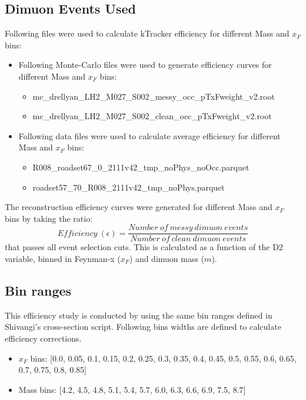 \documentclass[11pt]{article}
\begin{document}
\subsection{Dimuon Events Used}
Following files were used to calculate kTracker efficiency for different Mass and $x_{F}$ bins:
\begin{itemize}
 \item Following Monte-Carlo files were used to generate efficiency curves for different Mass and $x_{F}$ bins:
 \begin{itemize}
  \item mc\_drellyan\_LH2\_M027\_S002\_messy\_occ\_pTxFweight\_v2.root
  \item mc\_drellyan\_LH2\_M027\_S002\_clean\_occ\_pTxFweight\_v2.root
 \end{itemize}
 \item Following data files were used to calculate average efficiency for different Mass and $x_{F}$ bins:
 \begin{itemize}
	 \item R008\_roadset67\_0\_2111v42\_tmp\_noPhys\_noOcc.parquet
  \item roadset57\_70\_R008\_2111v42\_tmp\_noPhys.parquet
 \end{itemize}
\end{itemize}


The reconstruction efficiency curves were generated for different Mass and $x_{F}$ bins by taking the ratio: 
$$Efficiency\ (\epsilon) = \frac{Number\ of\ messy\ dimuon\ events}{Number\ of\ clean\ dimuon\ events}$$ 
that passes all event selection cuts. This is calculated as a function of the D2 variable, binned in Feynman-x ($x_F$) and dimuon mass ($m$).

\subsection{Bin ranges}
This efficiency study is conducted by using the same bin ranges defined in Shivangi's cross-section script.
Following bins widths are defined to calculate efficiency corrections.
\begin{itemize}
 \item $x_{F}$ bins: [0.0, 0.05, 0.1, 0.15, 0.2, 0.25, 0.3, 0.35, 0.4, 0.45, 0.5, 0.55, 0.6, 0.65, 0.7, 0.75, 0.8, 0.85]
 \item Mass bins: [4.2, 4.5, 4.8, 5.1, 5.4, 5.7, 6.0, 6.3, 6.6, 6.9, 7.5, 8.7]

\end{itemize}
\end{document}
